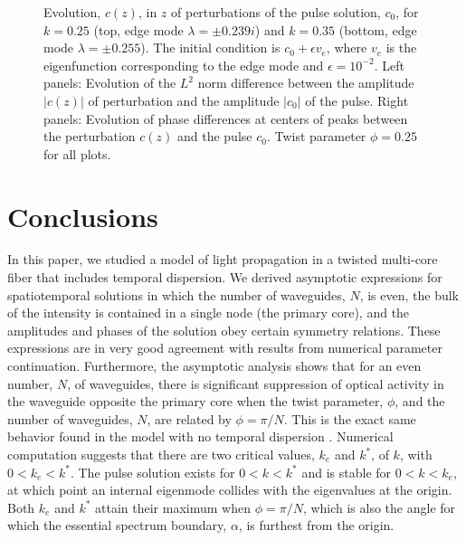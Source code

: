 \documentclass[11pt,reqno]{amsart}
\begin{document}
\begin{figure}
    \caption{Evolution, $c(z)$, in $z$ of perturbations of the pulse solution, $c_0$, for $k = 0.25$ (top, edge mode $\lambda = \pm 0.239i$) and $k = 0.35$ (bottom, edge mode $\lambda = \pm 0.255$). The initial condition is $c_0 + \epsilon v_e$, where $v_e$ is the eigenfunction corresponding to the edge mode and $\epsilon = 10^{-2}$. Left panels: Evolution of the $L^2$ norm difference between the amplitude $|c(z)|$ of perturbation and the amplitude $|c_0|$ of the pulse. Right panels: Evolution of phase differences at centers of peaks between the perturbation $c(z)$ and the pulse $c_0$. Twist parameter $\phi = 0.25$ for all plots.}
    \label{fig:evolz1}
\end{figure}

\section{Conclusions}

In this paper, we studied a model of light propagation in a twisted multi-core fiber that includes temporal dispersion. We derived asymptotic expressions for spatiotemporal solutions in which the number of waveguides, $N$, is even, the bulk of the intensity is contained in a single node (the primary core), and the amplitudes and phases of the solution obey certain symmetry relations. These expressions are in very good agreement with results from numerical parameter continuation. Furthermore, the asymptotic analysis shows that for an even number, $N$, of waveguides, there is significant suppression of optical activity in the waveguide opposite the primary core when the twist parameter, $\phi$, and the number of waveguides, $N$, are related by $\phi = \pi/N$. This is the exact same behavior found in the model with no temporal dispersion \cite{parker2021}.
Numerical computation suggests that there are two critical values, $k_e$ and $k^*$, of $k$, with $0 < k_e < k^*$. The pulse solution exists for $0 < k < k^*$ and is stable for $0 < k < k_e$, at which point an internal eigenmode collides with the eigenvalues at the origin. Both $k_e$ and $k^*$ attain their maximum when $\phi = \pi/N$, which is also the angle for which the essential spectrum boundary, $\alpha$, is furthest from the origin.
\end{document}
